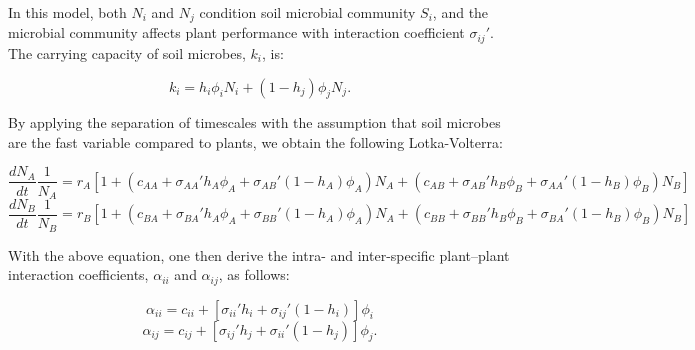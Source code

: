\noindent In this model, both $N_{i}$ and $N_{j}$ condition soil microbial community $S_{i}$, and the microbial community affects plant performance with interaction coefficient $\sigma_{ij}'$. The carrying capacity of soil microbes, $k_{i}$, is:

\begin{equation}
k_{i} = h_{i}\phi_{i}N_{i} + \left ( 1-h_{j} \right )\phi_{j}N_{j} .
\tag{S4.9}\label{eq:SoilCarrying_Cocondition}
\end{equation}

\noindent By applying the separation of timescales with the assumption that soil microbes are the fast variable compared to plants, we obtain the following Lotka-Volterra:

\makeatletter
\def\tagform@#1{\maketag@@@{\normalsize(#1)\@@italiccorr}}
\makeatother
\footnotesize
\begin{equation}
\frac{dN_{A}}{dt}\frac{1}{N_{A}} = r_{A} \left [ 1 +
\left ( c_{AA} + \sigma_{AA}'h_{A}\phi_{A} + \sigma_{AB}'\left ( 1-h_{A} \right )\phi_{A} \right )N_{A} + \left ( c_{AB} + \sigma_{AB}'h_{B}\phi_{B} + \sigma_{AA}'\left ( 1-h_{B} \right ) \phi_{B} \right )N_{B} \right ]
\tag{S4.10}\label{eq:LVA_Cocondition}
\end{equation}
\begin{equation}
\frac{dN_{B}}{dt}\frac{1}{N_{B}} = r_{B} \left [ 1 +
\left ( c_{BA} + \sigma_{BA}'h_{A}\phi_{A} + \sigma_{BB}'\left ( 1-h_{A} \right ) \phi_{A} \right )N_{A} + \left ( c_{BB} + \sigma_{BB}'h_{B}\phi_{B} + \sigma_{BA}'\left ( 1-h_{B} \right )\phi_{B} \right )N_{B} \right ]
\tag{S4.11}\label{eq:LVB_Cocondition}
\end{equation}
\normalsize

\noindent With the above equation, one then derive the intra- and inter-specific plant--plant interaction coefficients, $\alpha_{ii}$ and $\alpha_{ij}$, as follows:

\begin{equation}
\alpha_{ii} = c_{ii} + \left [ \sigma_{ii}'h_{i} + \sigma_{ij}'\left ( 1-h_{i} \right ) \right ]\phi_{i}
\tag{S4.12}\label{eq:alpha_Cocondition_con}
\end{equation}
\begin{equation}
\alpha_{ij} = c_{ij} + \left [ \sigma_{ij}'h_{j} + \sigma_{ii}'\left ( 1-h_{j} \right ) \right ]\phi_{j} .
\tag{S4.13}\label{eq:alpha_Cocondition_heter}
\end{equation}

